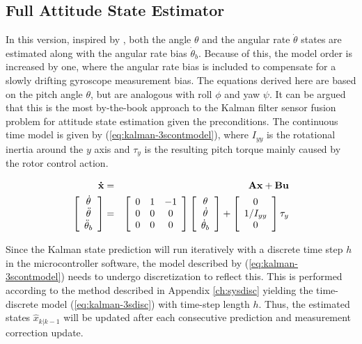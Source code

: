 \documentclass[a4paper]{report}
\begin{document}
	\subsection{Full Attitude State Estimator}

In this version, inspired by \cite{lhelgesson}, both the angle $\theta$ and the angular rate $\dot{\theta}$ states are estimated along with the angular rate bias $\dot{\theta}_b$. Because of this, the model order is increased by one, where the angular rate bias is included to compensate for a slowly drifting gyroscope measurement bias. The equations derived here are based on the pitch angle $\theta$, but are analogous with roll $\phi$ and yaw $\psi$. It can be argued that this is the most by-the-book approach to the Kalman filter sensor fusion problem for attitude state estimation given the preconditions. The continuous time model is given by (\ref{eq:kalman-3scontmodel}), where $I_{yy}$ is the rotational inertia around the $y$ axis and $\tau_y$ is the resulting pitch torque mainly caused by the rotor control action.

\begin{eqnarray}
	\mathbf{\dot{x}} & = & \mathbf{ A x } + \mathbf{ B u } \nonumber \\
		\left[
      		\begin{array}{c}
      		\dot{\theta}\\
		\ddot{\theta}\\
		\ddot{\theta}_{b}
      		\end{array} \right]
		& = &
		\left[
		\begin{array}{c c c}
		0 &   1 & -1 \\
		0 & 0 & 0 \\
		0 & 0 & 0 \\
		\end{array} \right]
		\left[
		\begin{array}{c}
		\theta\\
		\dot{\theta}\\
		\dot{\theta}_{b}
		\end{array} \right]
		+
		\left[
      		\begin{array}{c}
      		0\\
		1/I_{yy}\\
		0
      		\end{array} \right]
		\tau_y
		\label{eq:kalman-3scontmodel}
\end{eqnarray}

Since the Kalman state prediction will run iteratively with a discrete time step $h$ in the microcontroller software, the model described by (\ref{eq:kalman-3scontmodel}) needs to undergo discretization to reflect this. This is performed according to the method described in Appendix \ref{ch:sysdisc} yielding the time-discrete model (\ref{eq:kalman-3sdisc}) with time-step length $h$. Thus, the estimated states $\hat{x}_{k|k-1}$ will be updated after each consecutive prediction and measurement correction update. 
\end{document}
